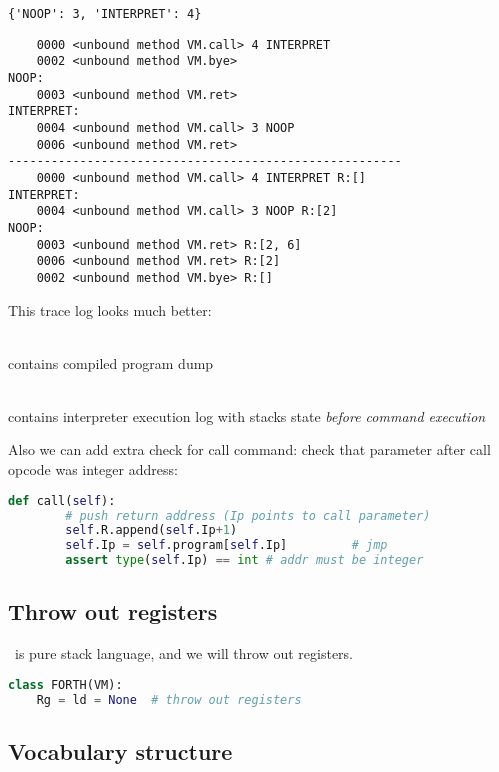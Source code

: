 \begin{lstlisting}
{'NOOP': 3, 'INTERPRET': 4}
\end{lstlisting}
\clearpage
\begin{lstlisting}
	0000 <unbound method VM.call> 4 INTERPRET 
	0002 <unbound method VM.bye> 
NOOP: 
	0003 <unbound method VM.ret> 
INTERPRET: 
	0004 <unbound method VM.call> 3 NOOP 
	0006 <unbound method VM.ret>
-------------------------------------------------------
	0000 <unbound method VM.call> 4 INTERPRET R:[] 
INTERPRET: 
	0004 <unbound method VM.call> 3 NOOP R:[2] 
NOOP: 
	0003 <unbound method VM.ret> R:[2, 6] 
	0006 <unbound method VM.ret> R:[2] 
	0002 <unbound method VM.bye> R:[]
\end{lstlisting}
This trace log looks much better:
\begin{description}[nosep]
\item[first part]\ \\contains compiled program dump
\item[second part]\ \\contains interpreter execution log with stacks state
\emph{before command execution}
\end{description}

\bigskip
Also we can add extra check for call command: check that parameter after call
opcode was integer address:
\begin{lstlisting}[language=Python]
	def call(self):
		# push return address (Ip points to call parameter)
		self.R.append(self.Ip+1)
		self.Ip = self.program[self.Ip]			# jmp
		assert type(self.Ip) == int	# addr must be integer
\end{lstlisting}

\subsection{Throw out registers}

\F\ is pure stack language, and we will throw out registers.
\begin{lstlisting}[language=Python]
class FORTH(VM):
	Rg = ld = None	# throw out registers
\end{lstlisting}

\subsection{Vocabulary structure}

